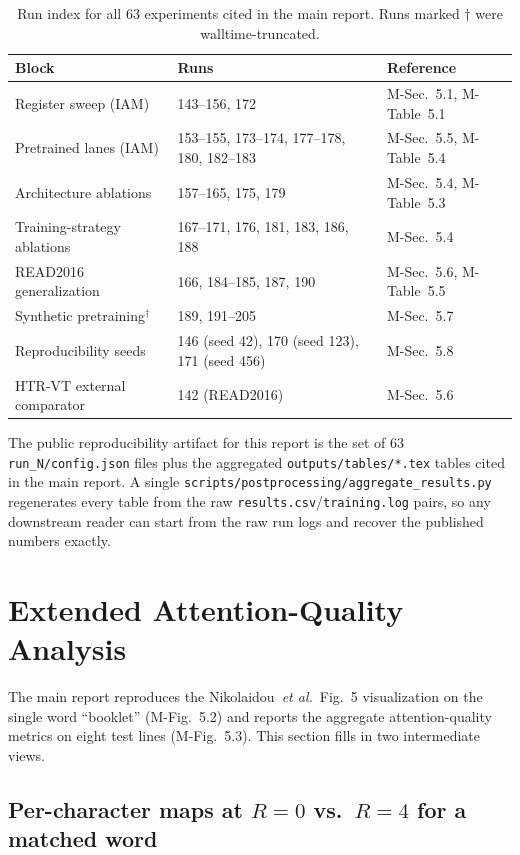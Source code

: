 \documentclass[11pt,a4paper]{article}
\newcommand{\etal}{\textit{et al.}}
\begin{document}
\begin{table}[h]
\centering
\small
\caption{Run index for all 63 experiments cited in the main report. Runs marked $\dagger$ were walltime-truncated.}
\label{tab:run_index}
\begin{tabular}{lp{6.5cm}l}
\toprule
Block & Runs & Reference \\
\midrule
Register sweep (IAM) & 143--156, 172 & M-Sec.~5.1, M-Table~5.1 \\
Pretrained lanes (IAM) & 153--155, 173--174, 177--178, 180, 182--183 & M-Sec.~5.5, M-Table~5.4 \\
Architecture ablations & 157--165, 175, 179 & M-Sec.~5.4, M-Table~5.3 \\
Training-strategy ablations & 167--171, 176, 181, 183, 186, 188 & M-Sec.~5.4 \\
READ2016 generalization & 166, 184--185, 187, 190 & M-Sec.~5.6, M-Table~5.5 \\
Synthetic pretraining$^\dagger$ & 189, 191--205 & M-Sec.~5.7 \\
Reproducibility seeds & 146 (seed 42), 170 (seed 123), 171 (seed 456) & M-Sec.~5.8 \\
HTR-VT external comparator & 142 (READ2016) & M-Sec.~5.6 \\
\bottomrule
\end{tabular}
\end{table}

The public reproducibility artifact for this report is the set of $63$ \texttt{run\_N/config.json} files plus the aggregated \texttt{outputs/tables/*.tex} tables cited in the main report. A single \texttt{scripts/postprocessing/aggregate\_results.py} regenerates every table from the raw \texttt{results.csv}/\texttt{training.log} pairs, so any downstream reader can start from the raw run logs and recover the published numbers exactly.

\section{Extended Attention-Quality Analysis}
\label{supp:attn_extra}

The main report reproduces the Nikolaidou~\etal\ Fig.~5 visualization on the single word ``booklet'' (M-Fig.~5.2) and reports the aggregate attention-quality metrics on eight test lines (M-Fig.~5.3). This section fills in two intermediate views.

\subsection{Per-character maps at $R = 0$ vs.\ $R = 4$ for a matched word}
\end{document}
